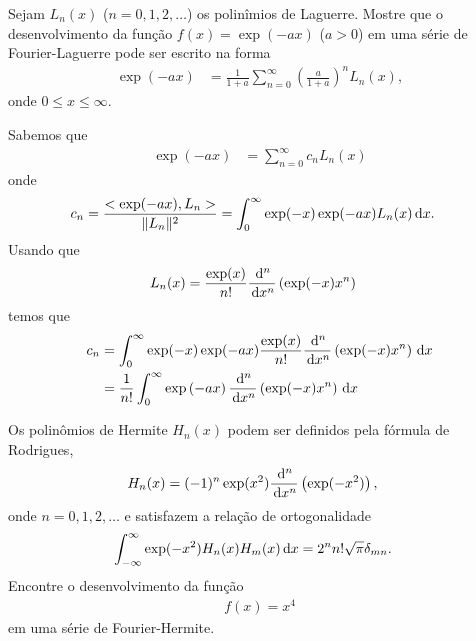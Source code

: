 \documentclass[a4paper,12pt, leqno, answers]{exam}
\begin{document}
\begin{questions}
    \question[T2 de 2011, P1 de 2011] Sejam $L_n(x)$ ($n = 0, 1, 2, \ldots$) os polinîmios de Laguerre. Mostre que o desenvolvimento da fun\c{c}\~{a}o $f(x) = \exp(-ax)$ ($a > 0$) em uma s\'{e}rie de Fourier-Laguerre pode ser escrito na forma
    \begin{align*}
        \exp\left( -ax \right) &= \frac{1}{1 + a} \sum_{n = 0}^\infty \left( \frac{a}{1 + a} \right)^n L_n(x),
    \end{align*}
    onde $0 \leq x \leq \infty$.
    \begin{solution}
        Sabemos que
        \begin{align*}
            \exp\left( -ax \right) &= \sum_{n = 0}^\infty c_n L_n(x)
        \end{align*}
        onde
        \begin{align*}
            c_n &= \frac{<\exp(-ax), L_n>}{\| L_n \|^2} = \int_0^\infty \exp(-x) \exp(-ax) L_n(x) \, \mathrm{d}x.
        \end{align*}
        Usando que
        \begin{align*}
            L_n(x) &= \frac{\exp(x)}{n!} \frac{\, \mathrm{d}^n}{\, \mathrm{d}x^n}\left( \exp(-x) x^n \right)
        \end{align*}
        temos que
        \begin{align*}
            c_n &= \int_0^\infty \exp(-x) \exp(-ax) \frac{\exp(x)}{n!} \frac{\, \mathrm{d}^n}{\, \mathrm{d}x^n}\left( \exp(-x) x^n \right) \, \mathrm{d}x \\
            &= \frac{1}{n!} \int_0^\infty \exp\left( -ax \right) \frac{\, \mathrm{d}^n}{\, \mathrm{d}x^n}\left( \exp(-x) x^n \right) \, \mathrm{d}x
        \end{align*}
    \end{solution}

    \question[P1 de 2011] Os polin\^{o}mios de Hermite $H_n(x)$ podem ser definidos pela f\'{o}rmula de Rodrigues,
    \begin{align*}
        H_n(x) &= (-1)^n \exp(x^2) \frac{\, \mathrm{d}^n}{\, \mathrm{d}x^n}\left( \exp(-x^2) \right),
    \end{align*}
    onde $n = 0, 1, 2, \ldots$ e satisfazem a rela\c{c}\~{a}o de ortogonalidade
    \begin{align*}
        \int_{-\infty}^\infty \exp(-x^2) H_n(x) H_m(x) \, \mathrm{d}x &= 2^n n! \sqrt{\pi} \delta_{mn}.
    \end{align*}
    Encontre o desenvolvimento da fun\c{c}\~{a}o
    \begin{align*}
        f(x) = x^4
    \end{align*}
    em uma s\'{e}rie de Fourier-Hermite.
    \begin{solution}
    \end{solution}
\end{questions}
% 
% 
\end{document}
